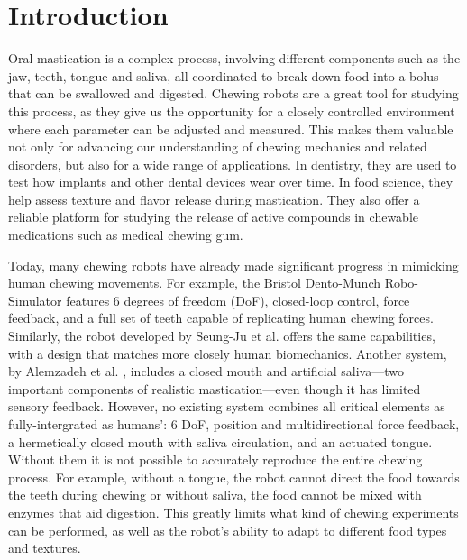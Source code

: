 \section{Introduction}


Oral mastication is a complex process, involving different components such as the jaw, teeth, tongue and saliva, all coordinated to break down food into 
a bolus that can be swallowed and digested. Chewing robots are a great tool for studying this process, as they give us the opportunity for a closely controlled environment where each parameter can be adjusted and measured. This makes them valuable not only for advancing our understanding of chewing mechanics and related disorders, but also for a wide range of applications. In dentistry, they are used to test how implants and other dental devices wear over time. In food science, they help assess texture and flavor release during mastication. They also offer a reliable platform for studying the release of active compounds in chewable medications such as medical chewing gum.

Today, many chewing robots have already made significant progress in mimicking human chewing movements.
For example, the Bristol Dento-Munch Robo-Simulator \cite{BristolChewingRobot} features 6 degrees of freedom 
(DoF), closed-loop control, force feedback, and a full set of teeth capable of replicating human chewing forces. Similarly, the robot developed by Seung-Ju 
et al. \cite{ChewingRobotLinearActuator} offers the same capabilities, with a design that matches more closely human biomechanics. Another system, by Alemzadeh 
et al. \cite{ChewingRobotGums}, includes a closed mouth and artificial saliva—two important components of realistic mastication—even though it has limited 
sensory feedback. However, no existing system combines all critical elements as fully-intergrated as humans': 6 DoF, position and multidirectional force feedback, a hermetically closed 
mouth with saliva circulation, and an actuated tongue. Without them it is not possible to accurately reproduce the entire chewing process. For example, without 
a tongue, the robot cannot direct the food towards the teeth during chewing or without saliva, the food cannot be mixed with enzymes that aid digestion. This greatly 
limits what kind of chewing experiments can be performed, as well as the robot's ability to adapt to different food types and textures.

